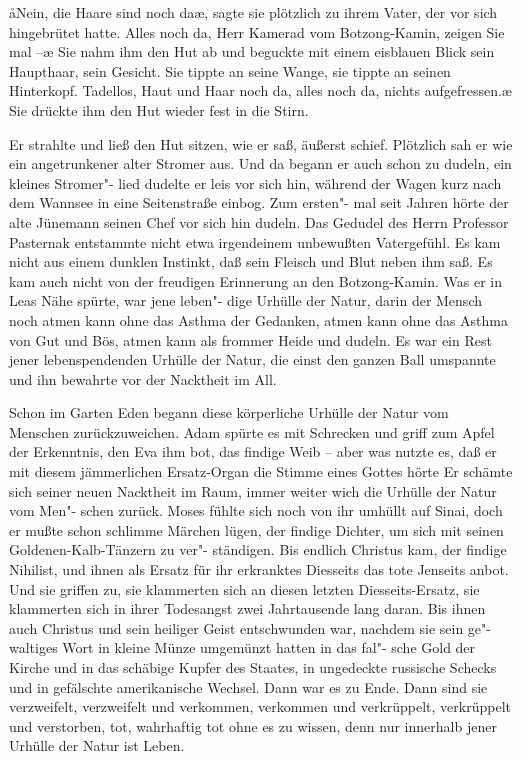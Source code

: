 \aa{}Nein, die Haare sind noch da\ae{}, sagte sie plötzlich zu ihrem
Vater, der vor sich hingebrütet hatte. \aanah{}Alles noch da, Herr
Kamerad vom Botzong-Kamin, zeigen Sie mal --\ae{} Sie nahm
ihm den Hut ab und beguckte mit einem eisblauen Blick sein
Haupthaar, sein Gesicht. Sie tippte an seine Wange, sie
tippte an seinen Hinterkopf. \aanah{}Tadellos, Haut und Haar
noch da, alles noch da, nichts aufgefressen.\ae{} Sie drückte ihm
den Hut wieder fest in die Stirn.

Er strahlte und ließ den Hut sitzen, wie er saß, äußerst schief.
Plötzlich sah er wie ein angetrunkener alter Stromer aus.
Und da begann er auch schon zu dudeln, ein kleines Stromer"-%
lied dudelte er leis vor sich hin, während der Wagen kurz
nach dem Wannsee in eine Seitenstraße einbog. Zum ersten"-%
mal seit Jahren hörte der alte Jünemann seinen Chef vor
sich hin dudeln.
\abstand{}
Das Gedudel des Herrn Professor Pasternak entstammte nicht
etwa irgendeinem unbewußten Vatergefühl. Es kam nicht aus
einem dunklen Instinkt, daß sein Fleisch und Blut neben ihm
saß. Es kam auch nicht von der freudigen Erinnerung an den
Botzong-Kamin. Was er in Leas Nähe spürte, war jene leben"-%
dige Urhülle der Natur, darin der Mensch noch atmen kann
ohne das Asthma der Gedanken, atmen kann ohne das Asthma
von Gut und Bös, atmen kann als frommer Heide und dudeln.
Es war ein Rest jener lebenspendenden Urhülle der Natur,
die einst den ganzen Ball umspannte und ihn bewahrte vor
der Nacktheit im All.

 Schon im Garten Eden begann diese körperliche
Urhülle der Natur vom Menschen zurückzuweichen. Adam
spürte es mit Schrecken und griff zum Apfel der Erkenntnis,
den Eva ihm bot, das findige Weib -- aber was nutzte es,
daß er mit diesem jämmerlichen Ersatz-Organ die Stimme
eines Gottes hörte\frag{} Er schämte sich seiner neuen Nacktheit im
Raum, immer weiter wich die Urhülle der Natur vom Men"-%
schen zurück. Moses fühlte sich noch von ihr umhüllt auf Sinai,
doch er mußte schon schlimme Märchen lügen, der findige
Dichter, um sich mit seinen Goldenen-Kalb-Tänzern zu ver"-%
ständigen. Bis endlich Christus kam, der findige Nihilist, und
ihnen als Ersatz für ihr erkranktes Diesseits das tote Jenseits
anbot. Und sie griffen zu, sie klammerten sich an diesen letzten
Diesseits-Ersatz, sie klammerten sich in ihrer Todesangst
zwei Jahrtausende lang daran. Bis ihnen auch Christus und
sein heiliger Geist entschwunden war, nachdem sie sein ge"-%
waltiges Wort in kleine Münze umgemünzt hatten\dopp{} in das fal"-%
sche Gold der Kirche und in das schäbige Kupfer des Staates,
in ungedeckte russische Schecks und in gefälschte amerikanische
Wechsel. Dann war es zu Ende. Dann sind sie verzweifelt,
verzweifelt und verkommen, verkommen und verkrüppelt,
verkrüppelt und verstorben, tot, wahrhaftig tot ohne es zu
wissen, denn nur innerhalb jener Urhülle der Natur ist
Leben.

